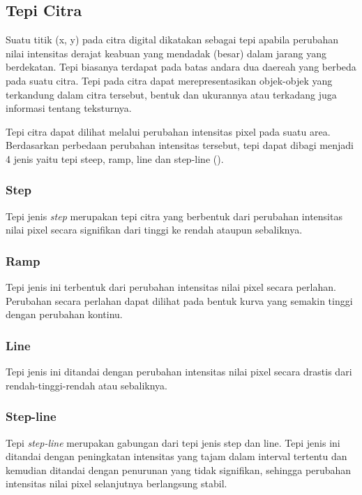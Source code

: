 \subsection{Tepi Citra}
Suatu titik (x, y) pada citra digital dikatakan sebagai tepi apabila perubahan nilai intensitas derajat keabuan yang mendadak (besar) dalam jarang yang berdekatan. Tepi biasanya terdapat pada batas andara dua daereah yang berbeda pada suatu citra. Tepi pada citra dapat merepresentasikan objek-objek yang terkandung dalam citra tersebut, bentuk dan ukurannya atau terkadang juga informasi tentang teksturnya.

Tepi citra dapat dilihat melalui perubahan intensitas pixel pada suatu area. Berdasarkan perbedaan perubahan intensitas tersebut, tepi dapat dibagi menjadi 4 jenis yaitu tepi steep, ramp, line dan step-line (\cite{book:darma}).

\subsubsection{Step}
Tepi jenis \textit{step} merupakan tepi citra yang berbentuk dari perubahan intensitas nilai pixel secara signifikan dari tinggi ke rendah ataupun sebaliknya.


\subsubsection{Ramp}
Tepi jenis ini terbentuk dari perubahan intensitas nilai pixel secara perlahan. Perubahan secara perlahan dapat dilihat pada bentuk kurva yang semakin tinggi dengan perubahan kontinu.

\subsubsection{Line}
Tepi jenis ini ditandai dengan perubahan intensitas nilai pixel secara drastis dari rendah-tinggi-rendah atau sebaliknya.

\subsubsection{Step-line}
Tepi \textit{step-line} merupakan gabungan dari tepi jenis step dan line. Tepi jenis ini ditandai dengan peningkatan intensitas yang tajam dalam interval tertentu dan kemudian ditandai dengan penurunan yang tidak signifikan, sehingga perubahan intensitas nilai pixel selanjutnya berlangsung stabil.


